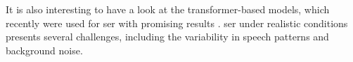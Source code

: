 \noindent It is also interesting to have a look at the transformer-based models, which recently were used for \acrshort{ser} with promising results \cite{transform}. \acrshort{ser} under realistic conditions presents several challenges, including the variability in speech patterns and background noise.




